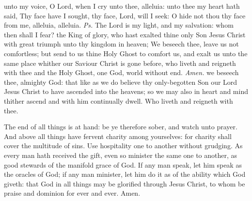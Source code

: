 \introit
{} unto my voice, O Lord, when I cry unto thee, alleluia: unto thee my heart hath said, Thy face have I sought, thy face, Lord, will I seek: O hide not thou thy face from me, alleluia, alleluia. \textit{Ps.} The Lord is my light, and my salvation: whom then shall I fear?
\collect
{} the King of glory, who hast exalted thine only Son Jesus Christ with great triumph unto thy kingdom in heaven; We beseech thee, leave us not comfortless; but send to us thine Holy Ghost to comfort us, and exalt us unto the same place whither our Saviour Christ is gone before, who liveth and reigneth with thee and the Holy Ghost, one God, world without end. \textit{Amen.}
 we beseech thee, almighty God: that like as we do believe thy only-begotten Son our Lord Jesus Christ to have ascended into the heavens; so we may also in heart and mind thither ascend and with him continually dwell. Who liveth and reigneth with thee.

 The end of all things is at hand: be ye therefore sober, and watch unto prayer. And above all things have fervent charity among yourselves: for charity shall cover the multitude of sins. Use hospitality one to another without grudging. As every man hath received the gift, even so minister the same one to another, as good stewards of the manifold grace of God. If any man speak, let him speak as the oracles of God; if any man minister, let him do it as of the ability which God giveth: that God in all things may be glorified through Jesus Christ, to whom be praise and dominion for ever and ever. Amen.


